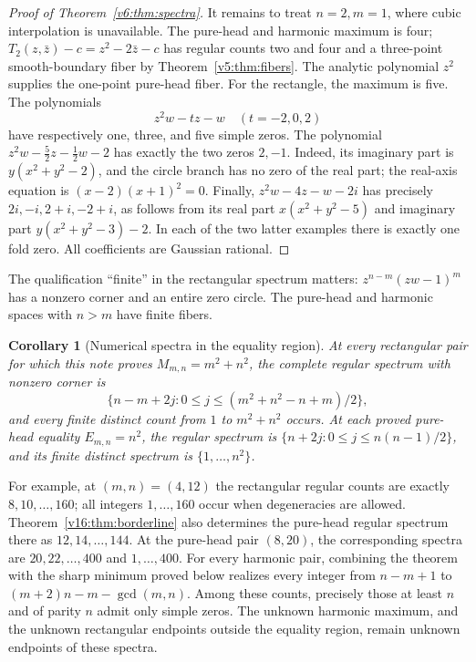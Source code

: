 \documentclass[UTF8,11pt]{ctexart}
\newtheorem{cor}[thm]{Corollary}
\theoremstyle{definition}
\numberwithin{equation}{section}
\begin{document}
\begin{proof}[Proof of Theorem~\ref{v6:thm:spectra}]
It remains to treat $n=2,m=1$, where cubic interpolation is
unavailable. The pure-head and harmonic maximum is four;
$T_2(z,\bar z)-c=z^2-2\bar z-c$ has regular counts two and
four and a three-point smooth-boundary fiber by
Theorem~\ref{v5:thm:fibers}. The analytic polynomial $z^2$
supplies the one-point pure-head fiber.
For the rectangle, the maximum is five. The polynomials
\[
 z^2w-tz-w\quad(t=-2,0,2)
\]
have respectively one, three, and five simple zeros. The polynomial
$z^2w-\tfrac52z-\tfrac12w-2$ has exactly the two zeros $2,-1$.
Indeed, its imaginary part is $y(x^2+y^2-2)$, and the circle
branch has no zero of the real part; the real-axis equation is
$(x-2)(x+1)^2=0$. Finally, $z^2w-4z-w-2i$ has precisely
$2i,-i,2+i,-2+i$, as follows from its real part
$x(x^2+y^2-5)$ and imaginary part
$y(x^2+y^2-3)-2$. In each of the two latter examples there is
exactly one fold zero. All coefficients are Gaussian rational.
\end{proof}

The qualification ``finite'' in the rectangular spectrum matters:
$z^{n-m}(zw-1)^m$ has a nonzero corner and an entire zero circle.
The pure-head and harmonic spaces with $n>m$ have finite fibers.

\begin{cor}[Numerical spectra in the equality region]\label{v6:cor:explicit}
At every rectangular pair for which this note proves
$M_{m,n}=m^2+n^2$, the complete regular spectrum with nonzero
corner is
\[
 \{n-m+2j:0\le j\le(m^2+n^2-n+m)/2\},
\]
and every finite distinct count from $1$ to $m^2+n^2$ occurs.
At each proved pure-head equality $E_{m,n}=n^2$, the regular
spectrum is $\{n+2j:0\le j\le n(n-1)/2\}$, and its finite
distinct spectrum is $\{1,\ldots,n^2\}$.
\end{cor}

For example, at $(m,n)=(4,12)$ the rectangular regular counts are
exactly $8,10,\ldots,160$; all integers $1,\ldots,160$ occur
when degeneracies are allowed. Theorem~\ref{v16:thm:borderline}
also determines the pure-head regular spectrum there as
$12,14,\ldots,144$. At the pure-head pair $(8,20)$,
the corresponding spectra are $20,22,\ldots,400$ and
$1,\ldots,400$. For every harmonic pair, combining the theorem
with the sharp minimum proved below realizes every integer from
$n-m+1$ to $(m+2)n-m-\gcd(m,n)$. Among these counts, precisely
those at least $n$ and of parity $n$ admit only simple zeros.
The unknown harmonic maximum, and the unknown rectangular endpoints
outside the equality region, remain unknown endpoints of these spectra.
\end{document}
